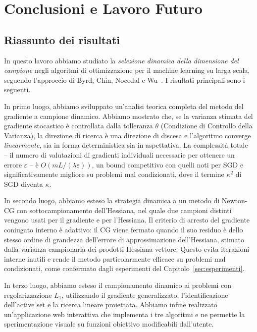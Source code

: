 \section{Conclusioni e Lavoro Futuro}\label{sec:conclusioni}

\subsection{Riassunto dei risultati}

In questo lavoro abbiamo studiato la \emph{selezione dinamica della dimensione
del campione} negli algoritmi di ottimizzazione per il machine learning su
larga scala, seguendo l'approccio di Byrd, Chin, Nocedal e Wu~\cite{byrd2012}.
I risultati principali sono i seguenti.

In primo luogo, abbiamo sviluppato un'analisi teorica completa del metodo del
gradiente a campione dinamico. Abbiamo mostrato che, se la varianza stimata
del gradiente stocastico è controllata dalla tolleranza $\theta$ (Condizione di
Controllo della Varianza), la direzione di ricerca è una direzione di discesa e
l'algoritmo converge \emph{linearmente}, sia in forma deterministica sia in
aspettativa. La complessità totale -- il numero di valutazioni di gradienti
individuali necessarie per ottenere un errore $\varepsilon$ -- è
$O(m L/(\lambda\varepsilon))$, un bound competitivo con quelli noti per SGD e
significativamente migliore su problemi mal condizionati, dove il termine
$\kappa^2$ di SGD diventa $\kappa$.

In secondo luogo, abbiamo esteso la strategia dinamica a un metodo di
Newton-CG con sottocampionamento dell'Hessiana, nel quale due campioni distinti
vengono usati per il gradiente e per l'Hessiana. Il criterio di arresto del
gradiente coniugato interno è adattivo: il CG viene fermato quando il suo
residuo è dello stesso ordine di grandezza dell'errore di approssimazione
dell'Hessiana, stimato dalla varianza campionaria dei prodotti
Hessiana-vettore. Questo evita iterazioni interne inutili e rende il metodo
particolarmente efficace su problemi mal condizionati, come confermato dagli
esperimenti del Capitolo~\ref{sec:esperimenti}.

In terzo luogo, abbiamo esteso il campionamento dinamico ai problemi con
regolarizzazione $L_1$, utilizzando il gradiente generalizzato, l'identificazione
dell'active set e la ricerca lineare proiettata. Abbiamo infine realizzato
un'applicazione web interattiva che implementa i tre algoritmi e ne permette la
sperimentazione visuale su funzioni obiettivo modificabili dall'utente.

